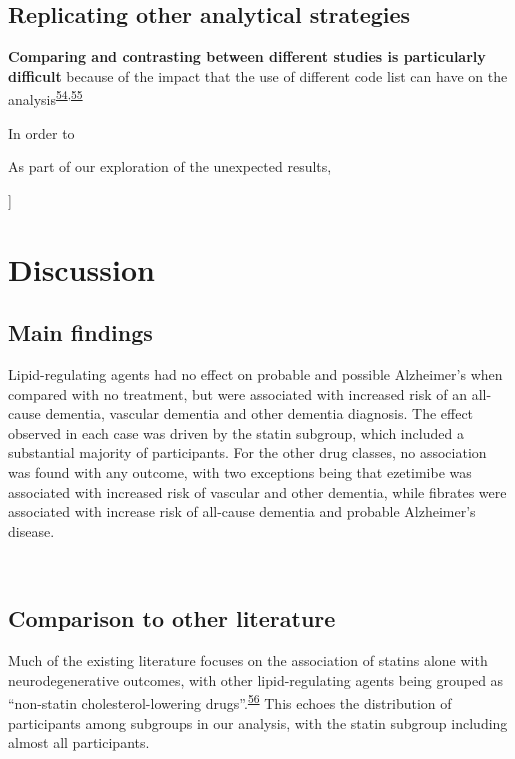\documentclass[a4paper, twoside]{templates/ociamthesis}
\begin{document}
\hypertarget{replicating-other-analytical-strategies}{%
\subsection{Replicating other analytical strategies}\label{replicating-other-analytical-strategies}}

\textbf{Comparing and contrasting between different studies is particularly difficult} because of the impact that the use of different code list can have on the analysis\textsuperscript{\protect\hyperlink{ref-wilkinson2018a}{54},\protect\hyperlink{ref-mcguinness2019c}{55}}

In order to

As part of our exploration of the unexpected results,

{]}

\hypertarget{discussion-2}{%
\section{Discussion}\label{discussion-2}}

\hypertarget{main-findings}{%
\subsection{Main findings}\label{main-findings}}

Lipid-regulating agents had no effect on probable and possible Alzheimer's when compared with no treatment, but were associated with increased risk of an all-cause dementia, vascular dementia and other dementia diagnosis. The effect observed in each case was driven by the statin subgroup, which included a substantial majority of participants. For the other drug classes, no association was found with any outcome, with two exceptions being that ezetimibe was associated with increased risk of vascular and other dementia, while fibrates were associated with increase risk of all-cause dementia and probable Alzheimer's disease.

~

\hypertarget{comparison-to-other-literature}{%
\subsection{Comparison to other literature}\label{comparison-to-other-literature}}

Much of the existing literature focuses on the association of statins alone with neurodegenerative outcomes, with other lipid-regulating agents being grouped as ``non-statin cholesterol-lowering drugs''.\textsuperscript{\protect\hyperlink{ref-ancelin2012}{56}} This echoes the distribution of participants among subgroups in our analysis, with the statin subgroup including almost all participants.
\end{document}
